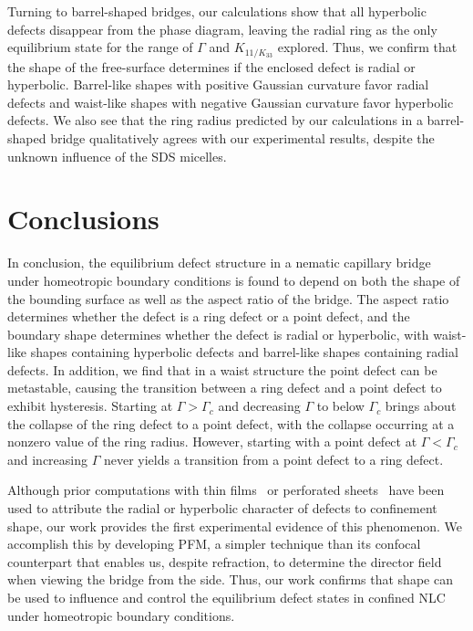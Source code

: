 Turning to barrel-shaped bridges, our calculations show that all hyperbolic defects disappear from the phase diagram, leaving the radial ring as the only equilibrium state for the range of $\Gamma$ and $K_{11/K_{33}}$ explored.
Thus, we confirm that the shape of the free-surface determines if the enclosed defect is radial or hyperbolic.
Barrel-like shapes with positive Gaussian curvature favor radial defects and waist-like shapes with negative Gaussian curvature favor hyperbolic defects.
We also see that the ring radius predicted by our calculations in a barrel-shaped bridge qualitatively agrees with our experimental results, despite the unknown influence of the SDS micelles.




\section{Conclusions}
In conclusion, the equilibrium defect structure in a nematic capillary bridge under homeotropic boundary conditions is found to depend on both the shape of the bounding surface as well as the aspect ratio of the bridge.
The aspect ratio determines whether the defect is a ring defect or a point defect, and the boundary shape determines whether the defect is radial or hyperbolic, with waist-like shapes containing hyperbolic defects and barrel-like shapes containing radial defects.
In addition, we find that in a waist structure the point defect can be metastable,  causing the transition between a ring defect and a point defect to exhibit hysteresis.
Starting at $\Gamma > \Gamma_c$ and decreasing $\Gamma$ to below $\Gamma_c$ brings about the collapse of the ring defect to a point defect, with the collapse occurring at a nonzero value of the ring radius.
However, starting with a point defect at $\Gamma < \Gamma_c$ and increasing $\Gamma$ never yields a transition from a point defect to a ring defect.

Although prior computations with thin films~\cite{RN141} or perforated sheets~\cite{RN149} have been used to attribute the radial or hyperbolic character of defects to confinement shape, our work provides the first experimental evidence of this phenomenon.
We accomplish this by developing PFM, a simpler technique than its confocal counterpart that enables us, despite refraction, to determine the director field when viewing the bridge from the side.
Thus, our work confirms that shape can be used to influence and control the equilibrium defect states in confined NLC under homeotropic boundary conditions.

